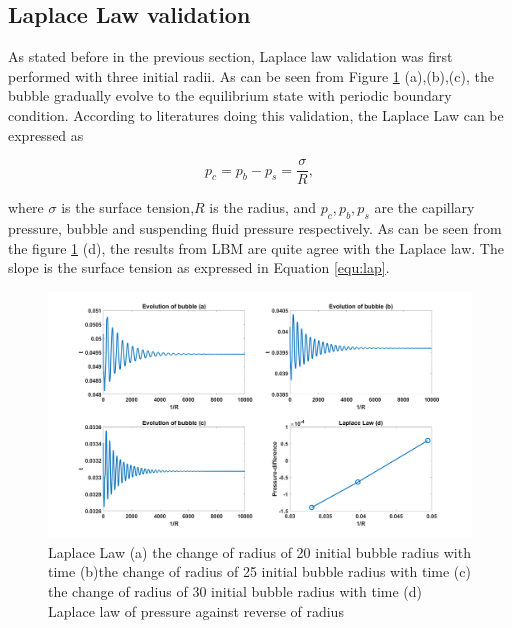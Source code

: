 \documentclass[review]{elsarticle}
\begin{document}
\subsection{Laplace Law validation}
As stated before in the previous section, Laplace law validation was first performed with three initial radii. As can be seen from Figure \ref{fig:lap-law} (a),(b),(c), the bubble gradually evolve to the equilibrium state with periodic boundary condition. According to literatures \cite{porter2012multicomponent,liu2010modified,ezzatneshan2021dynamics} doing this validation, the Laplace Law can be expressed as
\begin{linenomath}
\begin{equation}
	p_c=p_b-p_s=\frac{\sigma}{R},
	\label{equ:lap}
\end{equation}
\end{linenomath}
where $\sigma$ is the surface tension,$R$ is the radius, and $p_c, p_b,p_s$ are the capillary pressure, bubble and suspending fluid pressure respectively. As can be seen from the figure \ref{fig:lap-law} (d), the results from LBM are quite agree with the Laplace law. The slope is the surface tension as expressed in Equation \ref{equ:lap}.
\begin{figure}[htp]
	\centering
	\includegraphics[width=1\textwidth,height=0.5\textheight]{laplacelaw-mat}
	\caption{Laplace Law (a) the change of radius of 20 initial bubble radius with time (b)the change of radius of 25 initial bubble radius with time (c) the change of radius of 30 initial bubble radius with time (d) Laplace law of pressure against reverse of radius }
	\label{fig:lap-law}
\end{figure}
\newpage
\end{document}
